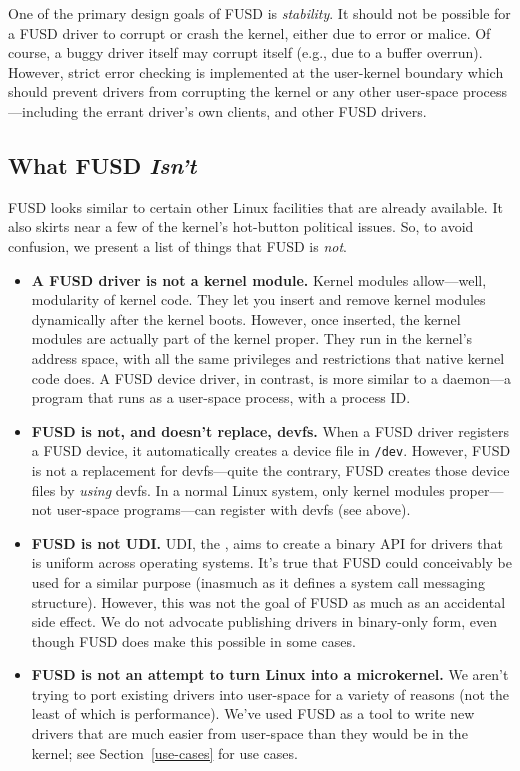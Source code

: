 \documentclass{article}
\begin{document}
One of the primary design goals of FUSD is {\em stability}.  It should
not be possible for a FUSD driver to corrupt or crash the kernel,
either due to error or malice.  Of course, a buggy driver itself may
corrupt itself (e.g., due to a buffer overrun).  However, strict error
checking is implemented at the user-kernel boundary which should
prevent drivers from corrupting the kernel or any other user-space
process---including the errant driver's own clients, and other FUSD
drivers.


\subsection{What FUSD {\em Isn't}}

FUSD looks similar to certain other Linux facilities that are already
available.  It also skirts near a few of the kernel's hot-button
political issues.  So, to avoid confusion, we present a list of
things that FUSD is {\em not}.

\begin{itemize}

\item {\bf A FUSD driver is not a kernel module.}  Kernel modules
allow---well, modularity of kernel code.  They let you insert and
remove kernel modules dynamically after the kernel boots.  However,
once inserted, the kernel modules are actually part of the kernel
proper.  They run in the kernel's address space, with all the same
privileges and restrictions that native kernel code does.  A FUSD
device driver, in contrast, is more similar to a daemon---a program
that runs as a user-space process, with a process ID.

\item {\bf FUSD is not, and doesn't replace, devfs.}  When a FUSD
driver registers a FUSD device, it automatically creates a device file
in {\tt /dev}.  However, FUSD is not a replacement for devfs---quite
the contrary, FUSD creates those device files by {\em using} devfs.
In a normal Linux system, only kernel modules proper---not user-space
programs---can register with devfs (see above).

\item {\bf FUSD is not UDI.}  UDI, the , aims to create a binary
API for drivers that is uniform across operating systems.  It's true
that FUSD could conceivably be used for a similar purpose (inasmuch as
it defines a system call messaging structure).  However, this was not
the goal of FUSD as much as an accidental side effect.  We do not
advocate publishing drivers in binary-only form, even though FUSD does
make this possible in some cases.

\item {\bf FUSD is not an attempt to turn Linux into a microkernel.}
We aren't trying to port existing drivers into user-space for a
variety of reasons (not the least of which is performance).  We've
used FUSD as a tool to write new drivers that are much easier from
user-space than they would be in the kernel; see
Section~\ref{use-cases} for use cases.


\end{itemize}
\end{document}
